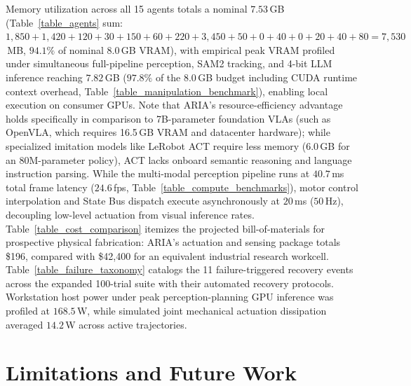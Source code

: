 \documentclass[journal]{IEEEtran}
\begin{document}
Memory utilization across all 15 agents totals a nominal $7.53$\,GB (Table~\ref{table_agents} sum: $1{,}850+1{,}420+120+30+150+60+220+3{,}450+50+0+40+0+20+40+80 = 7{,}530$\,MB, $94.1\%$ of nominal 8.0\,GB VRAM), with empirical peak VRAM profiled under simultaneous full-pipeline perception, SAM2 tracking, and 4-bit LLM inference reaching $7.82$\,GB ($97.8\%$ of the 8.0\,GB budget including CUDA runtime context overhead, Table~\ref{table_manipulation_benchmark}), enabling local execution on consumer GPUs. Note that ARIA's resource-efficiency advantage holds specifically in comparison to 7B-parameter foundation VLAs (such as OpenVLA, which requires 16.5\,GB VRAM and datacenter hardware); while specialized imitation models like LeRobot ACT require less memory (6.0\,GB for an 80M-parameter policy), ACT lacks onboard semantic reasoning and language instruction parsing. While the multi-modal perception pipeline runs at $40.7$\,ms total frame latency ($24.6$\,fps, Table~\ref{table_compute_benchmarks}), motor control interpolation and State Bus dispatch execute asynchronously at $20$\,ms ($50$\,Hz), decoupling low-level actuation from visual inference rates. Table~\ref{table_cost_comparison} itemizes the projected bill-of-materials for prospective physical fabrication: ARIA's actuation and sensing package totals \$196, compared with \$42,400 for an equivalent industrial research workcell. Table~\ref{table_failure_taxonomy} catalogs the 11 failure-triggered recovery events across the expanded 100-trial suite with their automated recovery protocols. Workstation host power under peak perception-planning GPU inference was profiled at $168.5$\,W, while simulated joint mechanical actuation dissipation averaged $14.2$\,W across active trajectories.

\section{Limitations and Future Work}
\label{sec_limitations}
\end{document}
